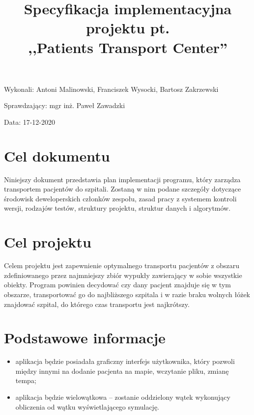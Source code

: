\documentclass{article}
\title{Specyfikacja implementacyjna projektu pt. \\ ,,Patients Transport Center''}
\author{}
\date{}
\begin{document}
\maketitle

\begin{flushright}
\par
\vfill
\par
{\fontsize{11}{11}\selectfont
    Wykonali: Antoni Malinowski, Franciszek Wysocki, Bartosz Zakrzewski

    Sprawdzający: mgr inż. Paweł Zawadzki

    Data: 17-12-2020
}
\end{flushright}
\thispagestyle{empty}

\newpage

\tableofcontents

\newpage


\section{Cel dokumentu}
{\fontsize{12}{12}\selectfont
Niniejszy dokument przedstawia plan implementacji programu, który zarządza transportem pacjentów do szpitali. Zostaną w nim podane szczegóły dotyczące środowisk deweloperskich członków zespołu, zasad pracy z systemem kontroli wersji, rodzajów testów, struktury projektu, struktur danych i algorytmów.

}

\section{Cel projektu}
{\fontsize{12}{12}\selectfont
    Celem projektu jest zapewnienie optymalnego transportu pacjentów z obszaru zdefiniowanego przez najmniejszy zbiór wypukły zawierający w sobie wszystkie obiekty. Program powinien decydować czy dany pacjent znajduje się w tym obszarze, transportować go do najbliższego szpitala i w razie braku wolnych łóżek znajdować szpital, do którego czas transportu jest najkrótszy.
}

\section{Podstawowe informacje}
{\fontsize{12}{12}\selectfont

\begin{itemize}
    \item aplikacja będzie posiadała graficzny interfejs użytkownika, który pozwoli między innymi na dodanie pacjenta na mapie, wczytanie pliku, zmianę tempa;
    \item aplikacja będzie wielowątkowa – zostanie oddzielony wątek wykonujący obliczenia od wątku wyświetlającego symulację.
\end{itemize}

}
\end{document}
